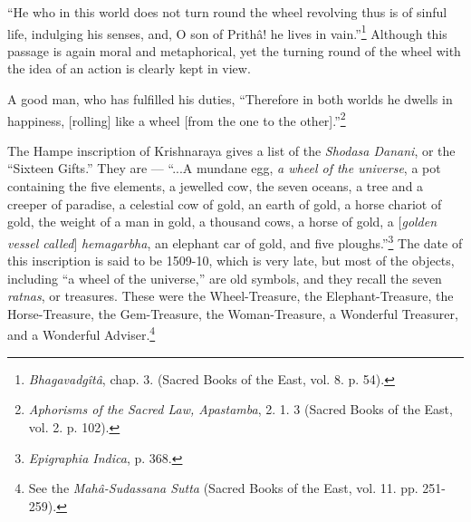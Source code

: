\documentclass[a4paper, 11pt, oneside, polutonikogreek, english]{article}
\begin{document}
``He who in this world does not turn round the wheel revolving thus is of sinful life, indulging his senses, and, O son of Prithâ! he lives in vain.''\footnote{\emph{Bhagavadgîtâ}, chap. 3. (Sacred Books of the East, vol. 8. p. 54).} Although this passage is again moral and metaphorical, yet the turning round of the wheel with the idea of an action is clearly kept in view.

A good man, who has fulfilled his duties, ``Therefore in both worlds he dwells in happiness, [rolling] like a wheel [from the one to the other].''\footnote{\emph{Aphorisms of the Sacred Law, Apastamba}, 2. 1. 3 (Sacred Books of the East, vol. 2. p. 102).}

The Hampe inscription of Krishnaraya gives a list of the \emph{Shodasa Danani}, or the ``Sixteen Gifts.'' They are --- ``...A mundane egg, \emph{a wheel of the universe}, a pot containing the five elements, a jewelled cow, the seven oceans, a tree and a creeper of paradise, a celestial cow of gold, an earth of gold, a horse chariot of gold, the weight of a man in gold, a thousand cows, a horse of gold, a [\emph{golden vessel called}] \emph{hemagarbha}, an elephant car of gold, and five ploughs.''\footnote{\emph{Epigraphia Indica}, p. 368.} The date of this inscription is said to be 1509-10, which is very late, but most of the objects, including ``a wheel of the universe,'' are old symbols, and they recall the seven \emph{ratnas}, or treasures. These were the Wheel-Treasure, the Elephant-Treasure, the Horse-Treasure, the Gem-Treasure, the Woman-Treasure, a Wonderful Treasurer, and a Wonderful Adviser.\footnote{See the \emph{Mahâ-Sudassana Sutta} (Sacred Books of the East, vol. 11. pp. 251-259).}
\end{document}

